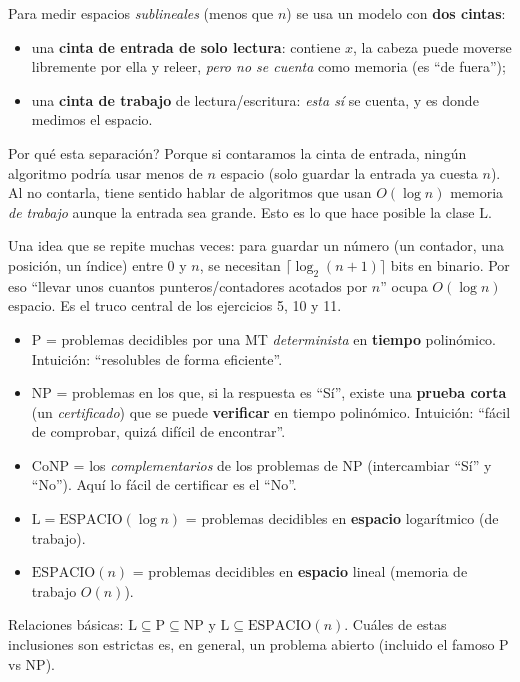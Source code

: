 \documentclass[11pt,a4paper]{article}
\theoremstyle{plain}
\theoremstyle{definition}
\newcommand{\NP}{\mathrm{NP}}
\newcommand{\coNP}{\mathrm{CoNP}}
\newcommand{\Pclass}{\mathrm{P}}
\newcommand{\Lclass}{\mathrm{L}}
\newcommand{\SPACE}{\mathrm{ESPACIO}}
\begin{document}
\begin{concepto}
Para medir espacios \emph{sublineales} (menos que $n$) se usa un modelo con
\textbf{dos cintas}:
\begin{itemize}[nosep]
  \item una \textbf{cinta de entrada de solo lectura}: contiene $x$, la cabeza puede
        moverse libremente por ella y releer, \emph{pero no se cuenta} como memoria
        (es ``de fuera'');
  \item una \textbf{cinta de trabajo} de lectura/escritura: \emph{esta s\'i} se
        cuenta, y es donde medimos el espacio.
\end{itemize}
\textquestiondown{}Por qu\'e esta separaci\'on? Porque si contaramos la cinta de entrada, ning\'un
algoritmo podr\'ia usar menos de $n$ espacio (solo guardar la entrada ya cuesta $n$).
Al no contarla, tiene sentido hablar de algoritmos que usan $O(\log n)$ memoria
\emph{de trabajo} aunque la entrada sea grande. Esto es lo que hace posible la clase
$\Lclass$.
\end{concepto}

\begin{concepto}
Una idea que se repite muchas veces: para guardar un n\'umero (un contador, una
posici\'on, un \'indice) entre $0$ y $n$, se necesitan $\lceil\log_2(n+1)\rceil$
bits en binario. Por eso ``llevar unos cuantos punteros/contadores acotados por $n$''
ocupa $O(\log n)$ espacio. Es el truco central de los ejercicios 5, 10 y 11.
\end{concepto}

\begin{concepto}[Las clases $\Pclass$, $\NP$, $\coNP$, $\Lclass$, $\SPACE(n)$]
\begin{itemize}[nosep]
  \item $\Pclass$ = problemas decidibles por una MT \emph{determinista} en
        \textbf{tiempo} polin\'omico. Intuici\'on: ``resolubles de forma eficiente''.
  \item $\NP$ = problemas en los que, si la respuesta es ``S\'i'', existe una
        \textbf{prueba corta} (un \emph{certificado}) que se puede \textbf{verificar}
        en tiempo polin\'omico. Intuici\'on: ``f\'acil de comprobar, quiz\'a dif\'icil
        de encontrar''.
  \item $\coNP$ = los \emph{complementarios} de los problemas de $\NP$ (intercambiar
        ``S\'i'' y ``No''). Aqu\'i lo f\'acil de certificar es el ``No''.
  \item $\Lclass = \SPACE(\log n)$ = problemas decidibles en \textbf{espacio}
        logar\'itmico (de trabajo).
  \item $\SPACE(n)$ = problemas decidibles en \textbf{espacio} lineal (memoria de
        trabajo $O(n)$).
\end{itemize}
Relaciones b\'asicas: $\Lclass\subseteq\Pclass\subseteq\NP$ y
$\Lclass\subseteq\SPACE(n)$. Cu\'ales de estas inclusiones son estrictas es, en
general, un problema abierto (incluido el famoso $\Pclass$ vs $\NP$).
\end{concepto}
\end{document}
